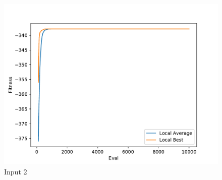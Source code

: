 \documentclass{standalone}
\begin{document}
\begin{figure}[!htb]
	\caption{Input 2}
	\label{fig:graph_2035}
	\includegraphics[width=\textwidth]{../graphs/graphs/2035.pdf}
\end{figure}
\end{document}
